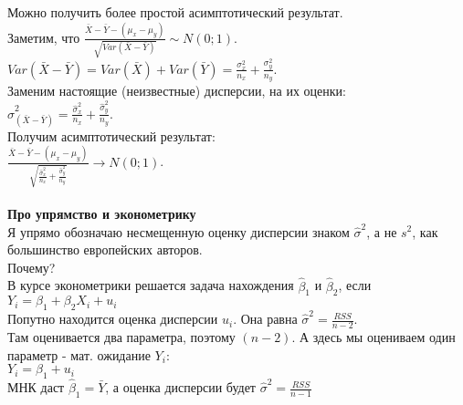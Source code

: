 \documentclass[pdftex,12pt,a4paper]{article}
\begin{document}
Можно получить более простой асимптотический результат. \\
Заметим, что $\frac{\bar{X}-\bar{Y}-(\mu_{x}-\mu_{y})}
{\sqrt{Var(\bar{X}-\bar{Y})}}\sim N(0;1)$. \\
$Var(\bar{X}-\bar{Y})=Var(\bar{X})+Var(\bar{Y})
=\frac{\sigma_{x}^{2}}{n_{x}}+\frac{\sigma_{y}^{2}}{n_{y}}$. \\
Заменим настоящие (неизвестные) дисперсии, на их оценки: \\
$\hat{\sigma}_{(\bar{X}-\bar{Y})}^{2}=
\frac{\hat{\sigma}_{x}^{2}}{n_{x}}+\frac{\hat{\sigma}_{y}^{2}}{n_{y}}$. \\
Получим асимптотический результат: \\
$\frac{\bar{X}-\bar{Y}-(\mu_{x}-\mu_{y})} {\sqrt
    {
    \frac{\hat{\sigma}_{x}^{2}}{n_{x}}+\frac{\hat{\sigma}_{y}^{2}}{n_{y}}
    }
}\rightarrow N(0;1)$. \\ \\


\textbf{Про упрямство и эконометрику} \\
Я упрямо обозначаю несмещенную оценку дисперсии знаком
$\hat{\sigma}^{2}$, а не $s^{2}$, как большинство европейских
авторов. \\
Почему? \\
В курсе эконометрики решается задача нахождения $\hat{\beta}_{1}$
и $\hat{\beta}_{2}$, если \\
$Y_{i}=\beta_{1}+\beta_{2}X_{i}+u_{i}$ \\
Попутно находится оценка дисперсии $u_{i}$. Она равна
$\hat{\sigma}^{2}=\frac{RSS}{n-2}$. \\
Там оценивается два параметра, поэтому $(n-2)$. А здесь мы
оцениваем один параметр - мат. ожидание $Y_{i}$: \\
$Y_{i}=\beta_{1}+u_{i}$ \\
МНК даст $\hat{\beta}_{1}=\bar{Y}$, а оценка дисперсии будет
$\hat{\sigma}^{2}=\frac{RSS}{n-1}$
\end{document}
